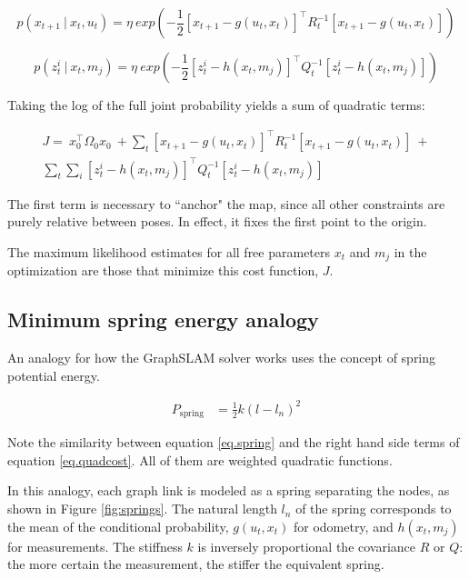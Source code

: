 \begin{equation}
p\left(x_{t+1}~|~x_t,u_t\right) = \eta~ exp\left(-\frac{1}{2}\left[x_{t+1} - g\left(u_t,x_t\right)\right]^{\intercal}R_t^{-1}\left[x_{t+1} - g\left(u_t,x_t\right)\right]\right)
\end{equation}

\begin{equation}
p\left(z^i_{t}~|~x_t,m_j\right) = \eta~ exp\left(-\frac{1}{2}\left[z^i_{t} - h\left(x_t,m_j\right)\right]^{\intercal}Q_t^{-1}\left[z^i_{t} - h\left(x_t,m_j\right)\right]\right)
\label{eq.measModel}
\end{equation}

Taking the log of the full joint probability yields a sum of quadratic terms:

\begin{multline}
J = ~x_0^{\intercal}\Omega_0 x_0 ~+
\sum_{t}{\left[x_{t+1} - g\left(u_t,x_t\right)\right]^{\intercal}R_t^{-1}\left[x_{t+1} - g\left(u_t,x_t\right)\right]} ~+ \\ \sum_{t}{\sum_{i}{\left[z^i_{t} - h\left(x_t,m_j\right)\right]^{\intercal}Q_t^{-1}\left[z^i_{t} - h\left(x_t,m_j\right)\right]}}
\label{eq.quadcost}
\end{multline}

The first term is necessary to ``anchor" the map, since all other constraints are purely relative between poses. In effect, it fixes the first point to the origin. 

The maximum likelihood estimates for all free parameters $x_t$ and $m_j$ in the optimization are those that minimize this cost function, $J$.

\subsection{Minimum spring energy analogy}

An analogy for how the GraphSLAM solver works uses the concept of spring potential energy. 

\begin{align}
P_{\text{spring}} &= \frac{1}{2}k\left(l-l_n\right)^2
\label{eq.spring}
\end{align}

Note the similarity between equation \ref{eq.spring} and the right hand side terms of equation \ref{eq.quadcost}. All of them are weighted quadratic functions.

In this analogy, each graph link is modeled as a spring separating the nodes, as shown in Figure \ref{fig:springs}. The natural length $l_n$ of the spring corresponds to the mean of the conditional probability,  $g\left(u_t,x_t\right)$ for odometry, and $h\left(x_t,m_j\right)$ for measurements. The stiffness $k$ is inversely proportional the covariance $R$ or $Q$: the more certain the measurement, the stiffer the equivalent spring. 

